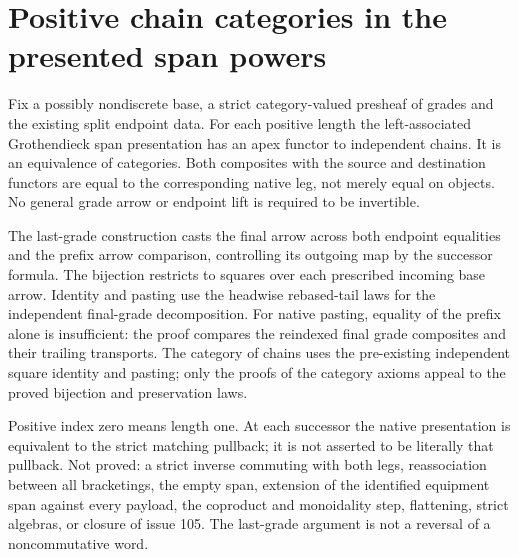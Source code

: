 \documentclass{article}
\begin{document}
\section*{Positive chain categories in the presented span powers}
Fix a possibly nondiscrete base, a strict category-valued presheaf of grades and the existing split endpoint data. For each positive length the left-associated Grothendieck span presentation has an apex functor to independent chains. It is an equivalence of categories. Both composites with the source and destination functors are equal to the corresponding native leg, not merely equal on objects. No general grade arrow or endpoint lift is required to be invertible.
\par The last-grade construction casts the final arrow across both endpoint equalities and the prefix arrow comparison, controlling its outgoing map by the successor formula. The bijection restricts to squares over each prescribed incoming base arrow. Identity and pasting use the headwise rebased-tail laws for the independent final-grade decomposition. For native pasting, equality of the prefix alone is insufficient: the proof compares the reindexed final grade composites and their trailing transports. The category of chains uses the pre-existing independent square identity and pasting; only the proofs of the category axioms appeal to the proved bijection and preservation laws.
\par Positive index zero means length one. At each successor the native presentation is equivalent to the strict matching pullback; it is not asserted to be literally that pullback. Not proved: a strict inverse commuting with both legs, reassociation between all bracketings, the empty span, extension of the identified equipment span against every payload, the coproduct and monoidality step, flattening, strict algebras, or closure of issue 105. The last-grade argument is not a reversal of a noncommutative word.
\end{document}
